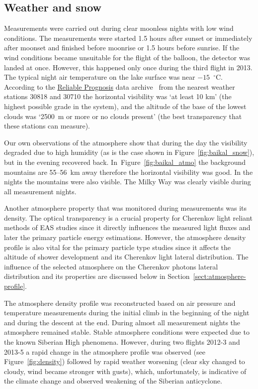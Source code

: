 \documentclass[universe,article,submit,moreauthors,pdftex]{Definitions/mdpi}
\begin{document}
\subsection{Weather and snow}

Measurements were carried out during clear moonless nights with low wind conditions. The measurements were started 1.5 hours after sunset or immediately after moonset and finished before moonrise or 1.5 hours before sunrise. If the wind conditions became unsuitable for the flight of the balloon, the detector was landed at once. However, this happened only once during the third flight in 2013. The typical night air temperature on the lake surface was near $-15$~$^\circ$C. According to the \href{https://rp5.ru/Weather_in_the_world}{Reliable Prognosis} data archive~\cite{rp5} from the nearest weather stations 30818 and 30710 the horizontal visibility was `at least 10 km' (the highest possible grade in the system), and the altitude of the base of the lowest clouds was `2500~m or more or no clouds present' (the best transparency that these stations can measure).

Our own observations of the atmosphere show that during the day the visibility degraded due to high humidity (as is the case shown in Figure~\ref{fig:baikal_snow}), but in the evening recovered back. In~Figure~\ref{fig:baikal_atmo} the background mountains are 55--56~km away therefore the horizontal visibility was good. In the nights the mountains were also visible. The Milky Way was clearly visible during all measurement nights. 

Another atmosphere property that was monitored during measurements was its density. The optical transparency is a crucial property for Cherenkov light reliant methods of EAS studies since it directly influences the measured light fluxes and later the primary particle energy estimations. However, the atmosphere density profile is also vital for the primary particle type studies since it affects the altitude of shower development and its Cherenkov light lateral distribution. The influence of the selected atmosphere on the Cherenkov photons lateral distribution and its properties are discussed below in Section~\ref{sect:atmosphere-profile}.

The atmosphere density profile was reconstructed based on air pressure and temperature measurements during the initial climb in the beginning of the night and during the descent at the end. During almost all measurement nights the atmosphere remained stable. Stable atmosphere conditions were expected due to the known Siberian High phenomena. However, during two flights 2012-3 and 2013-5 a rapid change in the atmosphere profile was observed (see Figure~\ref{fig:density}) followed by rapid weather worsening (clear sky changed to cloudy, wind became stronger with gusts), which, unfortunately, is indicative of the climate change and observed weakening of the Siberian anticyclone. 
\end{document}
